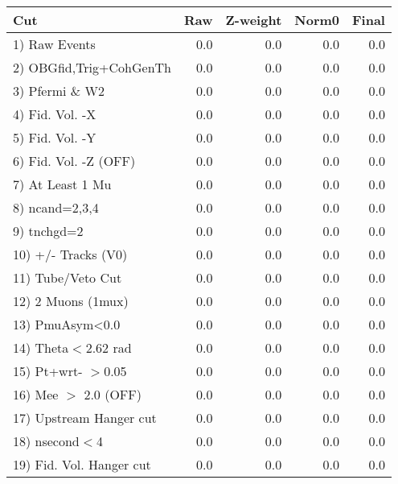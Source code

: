  \begin{table}[h!]\centering
 \begin{tabular}{||l||r|r|r|r||}
 \hline
 \hline
 Cut & Raw & Z-weight & Norm0 & Final \\
 \hline
  1) Raw Events           &         0.0 &         0.0 &         0.0 &         0.0 \\
  2) OBGfid,Trig+CohGenTh &         0.0 &         0.0 &         0.0 &         0.0 \\
  3) Pfermi \& W2         &         0.0 &         0.0 &         0.0 &         0.0 \\
  4) Fid. Vol. -X         &         0.0 &         0.0 &         0.0 &         0.0 \\
  5) Fid. Vol. -Y         &         0.0 &         0.0 &         0.0 &         0.0 \\
  6) Fid. Vol. -Z (OFF)   &         0.0 &         0.0 &         0.0 &         0.0 \\
  7) At Least 1 Mu        &         0.0 &         0.0 &         0.0 &         0.0 \\
  8) ncand=2,3,4          &         0.0 &         0.0 &         0.0 &         0.0 \\
  9) tnchgd=2             &         0.0 &         0.0 &         0.0 &         0.0 \\
 10) +/- Tracks (V0)      &         0.0 &         0.0 &         0.0 &         0.0 \\
 11) Tube/Veto Cut        &         0.0 &         0.0 &         0.0 &         0.0 \\
 12) 2 Muons (1mux)       &         0.0 &         0.0 &         0.0 &         0.0 \\
 13) PmuAsym<0.0          &         0.0 &         0.0 &         0.0 &         0.0 \\
 14) Theta$<$2.62 rad     &         0.0 &         0.0 &         0.0 &         0.0 \\
 15) Pt+wrt- $>$0.05      &         0.0 &         0.0 &         0.0 &         0.0 \\
 16) Mee $>$ 2.0  (OFF)   &         0.0 &         0.0 &         0.0 &         0.0 \\
 17) Upstream Hanger cut  &         0.0 &         0.0 &         0.0 &         0.0 \\
 18) nsecond$<$4          &         0.0 &         0.0 &         0.0 &         0.0 \\
 19) Fid. Vol. Hanger cut &         0.0 &         0.0 &         0.0 &         0.0 \\

\end{tabular}
\end{table}
